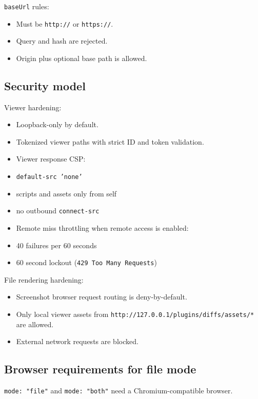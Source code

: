 \texttt{baseUrl} rules:

\begin{itemize}
  \item Must be \texttt{http://} or \texttt{https://}.
  \item Query and hash are rejected.
  \item Origin plus optional base path is allowed.
\end{itemize}


\subsection{Security model}


Viewer hardening:

\begin{itemize}
  \item Loopback-only by default.
  \item Tokenized viewer paths with strict ID and token validation.
  \item Viewer response CSP:
  \item \texttt{default-src 'none'}
  \item scripts and assets only from self
  \item no outbound \texttt{connect-src}
  \item Remote miss throttling when remote access is enabled:
  \item 40 failures per 60 seconds
  \item 60 second lockout (\texttt{429 Too Many Requests})
\end{itemize}


File rendering hardening:

\begin{itemize}
  \item Screenshot browser request routing is deny-by-default.
  \item Only local viewer assets from \texttt{http://127.0.0.1/plugins/diffs/assets/*} are allowed.
  \item External network requests are blocked.
\end{itemize}


\subsection{Browser requirements for file mode}


\texttt{mode: "file"} and \texttt{mode: "both"} need a Chromium-compatible browser.

